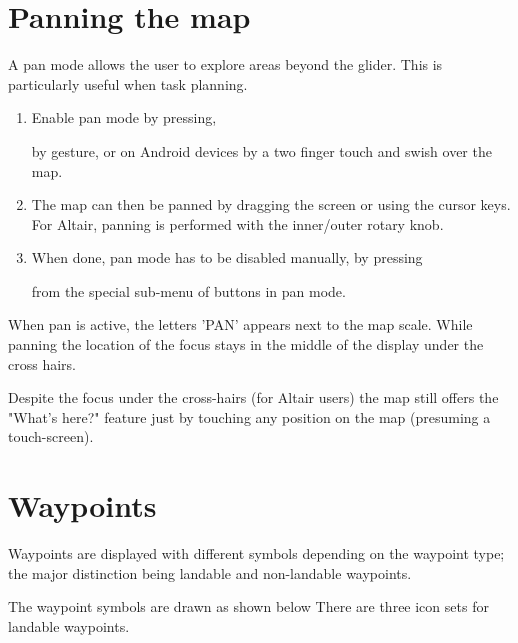 \section{Panning the map}\label{sec:panning}

A pan mode allows the user to explore areas beyond the glider.  This
is particularly useful when task planning.
\begin{enumerate}
\item Enable pan mode by pressing,  
\begin{quote}
\blink{}
\end{quote}
by gesture, or on Android devices by a two finger touch and swish over the map.

\item The map can then be panned by dragging the screen or using the cursor
  keys.  For Altair, panning is performed with the inner/outer rotary knob.
\item When done, pan mode has to be disabled manually, by pressing
\begin{quote}
\end{quote}
from the special sub-menu of buttons in pan mode.
\end{enumerate} 

When pan is active, the letters 'PAN' appears next to the map scale.  While
panning the location of the focus stays in the middle of the display under the
cross hairs. 

Despite the focus under the cross-hairs (for Altair users) the map 
still offers the "What's here?" feature just by touching any 
position on the map (presuming a touch-screen).


\section{Waypoints} \label{sec:waypoint-schemes}
Waypoints are displayed with different symbols depending on the
waypoint type; the major distinction being landable and non-landable
waypoints.

The waypoint symbols are drawn as shown below There are three icon sets for
landable waypoints. 

